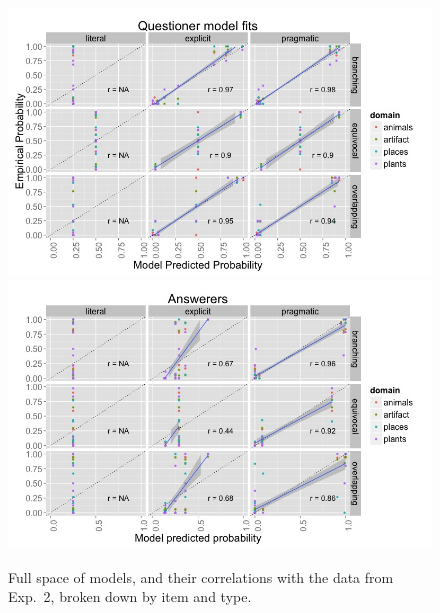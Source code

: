 \documentclass[12pt, floatsintext, jou]{apa6}
\begin{document}
%
\begin{figure}[t!]
\begin{center}
\includegraphics[scale=.57]{Exp4QuestFits.jpeg}
\includegraphics[scale=.57]{Exp4AnsFits.jpeg}
\end{center}
\caption{Full space of models, and their correlations with the data from Exp.~2, broken down by item and type.}
\label{fig:Exp4ModelSpace}
\end{figure}
%
\end{document}
